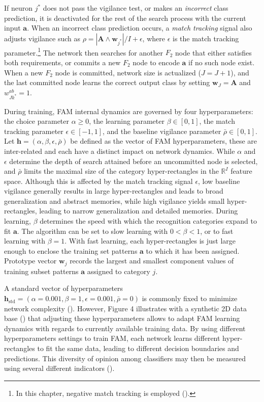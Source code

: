 If neuron $j^*$ does not pass the vigilance test, or makes an \emph{incorrect} class prediction, it is deactivated for the rest of the search process with the current input $\textbf{a}$.
When an incorrect class prediction occurs, a \emph{match tracking} signal also adjusts vigilance such as $\rho = |\textbf{A} \wedge	\textbf{w}_{j^*}|/I + \epsilon$, where $\epsilon$ is the match tracking parameter.\footnote{In this chapter, negative match tracking is employed (\cite{carpenter98}).}
The network then searches for another $F_2$ node that either satisfies both requirements, or commits a new $F_2$ node to encode $\textbf{a}$ if no such node exist.
When a new $F_2$ node is committed, network size is actualized ($J=J+1$), and the last committed node learns the correct output class by setting  $\textbf{w}_J = \textbf{A}$ and $w^{ab}_{Jk^*} = 1$.

During training, FAM internal dynamics are governed by four hyperparameters: the choice parameter $\alpha \geq 0$, the learning parameter $\beta \in [0,1]$, the match tracking parameter $\epsilon \in [-1,1]$, and the baseline vigilance parameter $\bar{\rho} \in [0,1]$.
Let $\textbf{h}=(\alpha, \beta, \epsilon, \bar{\rho})$ be defined as the vector of FAM hyperparameters, these are inter-related and each have a distinct impact on network dynamics.
While $\alpha$ and $\epsilon$ determine the depth of search attained before an uncommitted node is selected, and $\bar{\rho}$ limits the maximal size of the category hyper-rectangles in the $\mathbb{R}^I$ feature space.
Although this is affected by the match tracking signal $\epsilon$, low baseline vigilance generally results in large hyper-rectangles and leads to broad generalization and abstract memories, while high vigilance yields small hyper-rectangles, leading to narrow generalization and detailed memories.
During learning, $\beta$ determines the speed with which the recognition categories expand to fit $\textbf{a}$.
The algorithm can be set to slow learning with $0<\beta<1$, or to fast learning with $\beta=1$.
With fast learning, each hyper-rectangles is just large enough to enclose the training set patterns $\textbf{a}$ to which it has been assigned.
Prototype vector $\textbf{w}_j$ records the largest and smallest component values of training subset patterns $\textbf{a}$ assigned to category $j$.

A standard vector of hyperparameters $\textbf{h}_\text{std} = (\alpha = 0.001, \beta=1, \epsilon=0.001, \bar{\rho}=0)$ is commonly fixed to minimize network complexity (\cite{carpenter92}).
However, Figure 4 illustrates with a synthetic 2D data base (\cite{valentini03}) that adjusting these hyperparameters allows to adapt FAM learning dynamics with regards to currently available training data.
By using different hyperparameters settings to train FAM, each network learns different hyper-rectangles to fit the same data, leading to different decision boundaries and predictions.
This diversity of opinion among classifiers may then be measured using several different indicators (\cite{canuto07, hadjitodorov06, kapp07, oliveira09, sirlantzis08, ulas09}).

